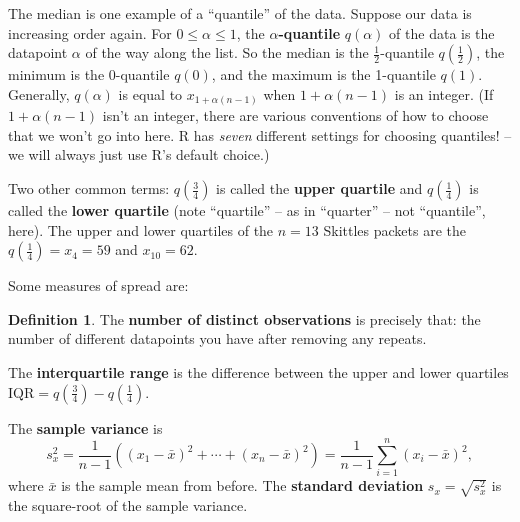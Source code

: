 \documentclass[
  a4paper,
]{book}
\theoremstyle{definition}
\newtheorem{definition}{Definition}[chapter]
\theoremstyle{definition}
\theoremstyle{definition}
\theoremstyle{definition}
\theoremstyle{remark}
\begin{document}
The median is one example of a ``quantile'' of the data. Suppose our data is increasing order again. For \(0 \leq \alpha \leq 1\), the \textbf{\(\alpha\)-quantile} \(q(\alpha)\) of the data is the datapoint \(\alpha\) of the way along the list. So the median is the \(\frac12\)-quantile \(q(\frac12)\), the minimum is the 0-quantile \(q(0)\), and the maximum is the 1-quantile \(q(1)\). Generally, \(q(\alpha)\) is equal to \(x_{1+\alpha(n-1)}\) when \(1+\alpha(n-1)\) is an integer. (If \(1+\alpha(n-1)\) isn't an integer, there are various conventions of how to choose that we won't go into here. R has \emph{seven} different settings for choosing quantiles! -- we will always just use R's default choice.)

Two other common terms: \(q(\frac34)\) is called the \textbf{upper quartile} and \(q(\frac14)\) is called the \textbf{lower quartile} (note ``quartile'' -- as in ``quarter'' -- not ``quantile'', here). The upper and lower quartiles of the \(n = 13\) Skittles packets are the \(q(\frac14) = x_4 = 59\) and \(x_{10} = 62\).

Some measures of spread are:

\begin{definition}
The \textbf{number of distinct observations} is precisely that: the number of different datapoints you have after removing any repeats.

The \textbf{interquartile range} is the difference between the upper and lower quartiles \(\text{IQR} = q(\frac34) - q(\frac14)\).

The \textbf{sample variance} is
\[  s^2_x = \frac{1}{n-1} \left((x_1 - \bar x)^2 + \cdots + (x_n - \bar x)^2 \right) = \frac{1}{n-1} \sum_{i=1}^n (x_i - \bar x)^2 , \]
where \(\bar x\) is the sample mean from before. The \textbf{standard deviation} \(s_x = \sqrt{s^2_x}\) is the square-root of the sample variance.
\end{definition}
\end{document}
